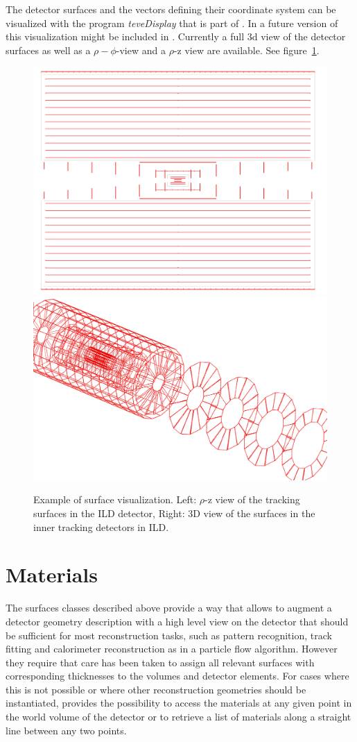 \documentclass[10pt,a4paper]{article}
\begin{document}
The detector surfaces and the vectors defining their coordinate system can be
visualized with the program {\em teveDisplay} that is part of \DDH. In a future
version of \DDH this visualization might be included in \DDE.
Currently a full 3d view of the detector surfaces as well as a $\rho-\phi$-view
and a $\rho$-z view are available. See figure~\ref{fig:ddrec_surfaces_visualization}.

\begin{figure}[h]
  \begin{center}
    \includegraphics[width=0.48\hsize]{DDRec_rhoz_surfaces} \includegraphics[width=0.48\hsize]{DDRec_inner_tracking_surfaces}
    \caption{Example of surface visualization. Left: $\rho$-z view of the tracking surfaces in the ILD detector, Right: 3D view of the 
    surfaces in the inner tracking detectors in ILD.}
    \label{fig:ddrec_surfaces_visualization}
  \end{center}
\end{figure}
 


\section{Materials}
\label{sec:ddrec-manual-materials}
The surfaces classes described above provide a way that allows to
augment a detector geometry description with a high level view on the detector
that should be sufficient for most reconstruction tasks, such as pattern
recognition, track fitting and calorimeter reconstruction as in a particle 
flow algorithm. However they require that care has been taken to assign all
relevant surfaces with corresponding thicknesses to the volumes and detector
elements. For cases where this is not possible or where other reconstruction
geometries should be instantiated, \DDR provides the possibility to access
the materials at any given point in the world volume of the detector or 
to retrieve a list of materials along a straight line between any two points.
\end{document}
